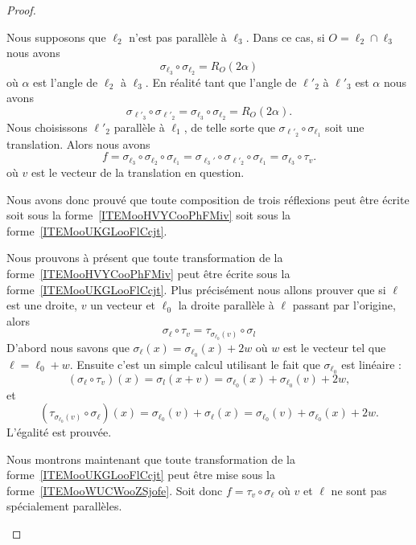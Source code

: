 \begin{proof}
\begin{subproof}
		Nous supposons que \( \ell_2\) n'est pas parallèle à \( \ell_3\). Dans ce cas, si \( O=\ell_2\cap\ell_3\) nous avons
		\begin{equation}
			\sigma_{\ell_3}\circ\sigma_{\ell_2}=R_O(2\alpha)
		\end{equation}
		où \( \alpha\) est l'angle de \( \ell_2\) à \( \ell_3\). En réalité tant que l'angle de \( \ell'_2\) à \( \ell'_3\) est \( \alpha\) nous avons
		\begin{equation}
			\sigma_{\ell'_3}\circ\sigma_{\ell'_2}= \sigma_{\ell_3}\circ\sigma_{\ell_2}=R_O(2\alpha).
		\end{equation}
		Nous choisissons \( \ell'_2\) parallèle à \( \ell_1\), de telle sorte que \( \sigma_{\ell'_2}\circ\sigma_{\ell_1}\) soit une translation. Alors nous avons
		\begin{equation}
			f=\sigma_{\ell_3}\circ\sigma_{\ell_2}\circ\sigma_{\ell_1}=\sigma_{\ell_3'}\circ\sigma_{\ell'_2}\circ\sigma_{\ell_1}=\sigma_{\ell_3}\circ\tau_v.
		\end{equation}
		où \( v\) est le vecteur de la translation en question.

		Nous avons donc prouvé que toute composition de trois réflexions peut être écrite soit sous la forme~\ref{ITEMooHVYCooPhFMiv} soit sous la forme~\ref{ITEMooUKGLooFlCcjt}.

		Nous prouvons à présent que toute transformation de la forme~\ref{ITEMooHVYCooPhFMiv} peut être écrite sous la forme~\ref{ITEMooUKGLooFlCcjt}. Plus précisément nous allons prouver que si \( \ell\) est une droite, \( v\) un vecteur et \( \ell_0\) la droite parallèle à \( \ell\) passant par l'origine, alors
		\begin{equation}
			\sigma_{\ell}\circ\tau_v=\tau_{\sigma_{\ell_0}(v)}\circ\sigma_l
		\end{equation}
		D'abord nous savons que \( \sigma_{\ell}(x)=\sigma_{\ell_0}(x)+2w\) où \( w\) est le vecteur tel que \( \ell=\ell_0+w\). Ensuite c'est un simple calcul utilisant le fait que \( \sigma_{\ell_0}\) est linéaire :
		\begin{equation}
			(\sigma_{\ell}\circ\tau_v)(x)=\sigma_l(x+v)=\sigma_{\ell_0}(x)+\sigma_{\ell_0}(v)+2w,
		\end{equation}
		et
		\begin{equation}
			(\tau_{\sigma_{\ell_0}(v)}\circ\sigma_{\ell})(x)=\sigma_{\ell_0}(v)+\sigma_{\ell}(x)=\sigma_{\ell_0}(v)+\sigma_{\ell_0}(x)+2w.
		\end{equation}
		L'égalité est prouvée.

		Nous montrons maintenant que toute transformation de la forme~\ref{ITEMooUKGLooFlCcjt} peut être mise sous la forme~\ref{ITEMooWUCWooZSjofe}. Soit donc \( f=\tau_v\circ\sigma_{\ell}\) où \( v\) et \( \ell\) ne sont pas spécialement parallèles.


\end{subproof}
\end{proof}
